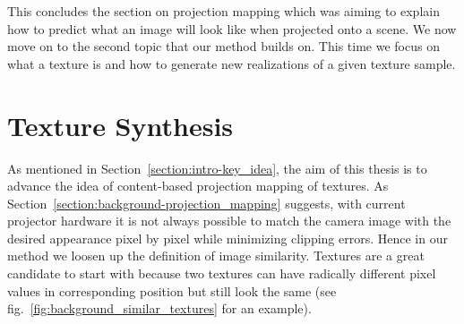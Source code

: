 This concludes the section on projection mapping which was aiming to explain how to predict what an image will look like when projected onto a scene. We now move on to the second topic that our method builds on. This time we focus on what a texture is and how to generate new realizations of a given texture sample.

\section{Texture Synthesis}
\label{section:background-texture_synthesis}

As mentioned in Section~\ref{section:intro-key_idea}, the aim of this thesis is to advance the idea of content-based projection mapping of textures. As Section~\ref{section:background-projection_mapping} suggests, with current projector hardware it is not always possible to match the camera image with the desired appearance pixel by pixel while minimizing clipping errors. Hence in our method we loosen up the definition of image similarity. Textures are a great candidate to start with because two textures can have radically different pixel values in corresponding position but still look the same (see fig.~\ref{fig:background_similar_textures} for an example).

